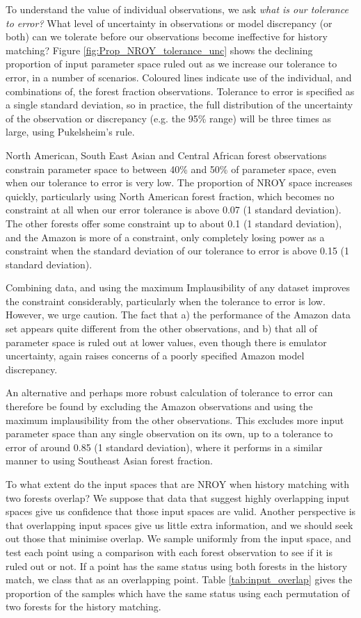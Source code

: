 \documentclass[esd, manuscript]{copernicus}
\begin{document}
To understand the value of individual observations, we ask \emph{what is our tolerance to error?} What level of uncertainty in observations or model discrepancy (or both) can we tolerate before our observations become ineffective for history matching? Figure \ref{fig:Prop_NROY_tolerance_unc} shows the declining proportion of input parameter space ruled out as we increase our tolerance to error, in a number of scenarios. Coloured lines indicate use of the individual, and combinations of, the forest fraction observations. Tolerance to error is specified as a single standard deviation, so in practice, the full distribution of the uncertainty of the observation or discrepancy (e.g. the 95\% range) will be three times as large, using Pukelsheim's rule.

North American, South East Asian and Central African forest observations constrain parameter space to between 40\% and 50\% of parameter space, even when our tolerance to error is very low. The proportion of NROY space increases quickly, particularly using North American forest fraction, which becomes no constraint at all when our error tolerance is above 0.07 (1 standard deviation). The other forests offer some constraint up to about 0.1 (1 standard deviation), and the Amazon is more of a constraint, only completely losing power as a constraint when the standard deviation of our tolerance to error is above 0.15 (1 standard deviation).

Combining data, and using the maximum Implausibility of any dataset improves the constraint considerably, particularly when the tolerance to error is low. However, we urge caution. The fact that a) the performance of the Amazon data set appears quite different from the other observations, and b) that all of parameter space is ruled out at lower values, even though there is emulator uncertainty, again raises concerns of a poorly specified Amazon model discrepancy. 

An alternative and perhaps more robust calculation of tolerance to error can therefore be found by excluding the Amazon observations and using the maximum implausibility from the other observations. This excludes more input parameter space than any single observation on its own, up to a tolerance to error of around 0.85 (1 standard deviation), where it performs in a similar manner to using Southeast Asian forest fraction.
 

To what extent do the input spaces that are NROY when history matching with two forests overlap? We suppose that data that suggest highly overlapping input spaces give us confidence that those input spaces are valid. Another perspective is that overlapping input spaces give us little extra information, and we should seek out those that minimise overlap. We sample uniformly from the input space, and test each point using a comparison with each forest observation to see if it is ruled out or not. If a point has the same status using both forests in the history match, we class that as an overlapping point. Table \ref{tab:input_overlap} gives the proportion of the samples which have the same status using each permutation of two forests for the history matching.
\end{document}

